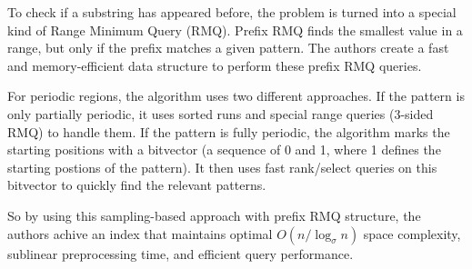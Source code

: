 To check if a substring has appeared before, the problem is turned into a special kind of Range Minimum Query (RMQ). Prefix RMQ finds the smallest value in a range, but only if the prefix matches a given pattern. The authors create a fast and memory-efficient data structure to perform these prefix RMQ queries.

For periodic regions, the algorithm uses two different approaches. If the pattern is only partially periodic, it uses sorted runs and special range queries (3-sided RMQ) to handle them. If the pattern is fully periodic, the algorithm marks the starting positions with a bitvector (a sequence of 0 and 1, where 1 defines the starting postions of the pattern). It then uses fast rank/select queries on this bitvector to quickly find the relevant patterns.

So by using this sampling-based approach with prefix RMQ structure, the authors achive an index that maintains optimal \( O(n / \log_{\sigma} n) \) space complexity, sublinear preprocessing time, and efficient query performance.
